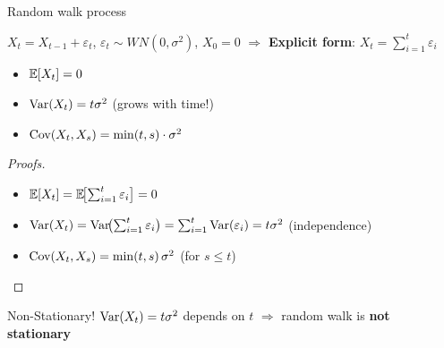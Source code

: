 \documentclass[9pt, aspectratio=169, t]{beamer}
\begin{document}
\begin{frame}{Random walk process}
    \small
    \vspace{-3mm}
    \begin{defn}
        $X_t = X_{t-1} + \varepsilon_t$, \; $\varepsilon_t \sim WN(0, \sigma^2)$, $X_0 = 0$ \;\;
        $\Rightarrow$ \textbf{Explicit form}: $X_t = \sum_{i=1}^{t} \varepsilon_i$
    \end{defn}
    \vspace{-2mm}
    {\footnotesize
    \begin{prop}[Properties]
        \begin{itemize}\setlength{\itemsep}{0pt}
            \item $\mathbb{E}[X_t] = 0$
            \item $\text{Var}(X_t) = t\sigma^2$ (grows with time!)
            \item $\text{Cov}(X_t, X_s) = \min(t, s) \cdot \sigma^2$
        \end{itemize}
    \end{prop}
    }
    \vspace{-2mm}
    {\scriptsize
    \begin{proof}[Proofs]
    \begin{itemize}\setlength{\itemsep}{0pt}
        \item $\mathbb{E}[X_t] = \mathbb{E}\!\bigl[\sum_{i=1}^{t} \varepsilon_i\bigr] = 0$
        \item $\text{Var}(X_t) = \text{Var}\!\bigl(\sum_{i=1}^{t} \varepsilon_i\bigr) = \sum_{i=1}^{t} \text{Var}(\varepsilon_i) = t\sigma^2$ \quad (independence)
        \item $\text{Cov}(X_t, X_s) = \min(t,s)\,\sigma^2$ \; (for $s \leq t$)
    \end{itemize}
    \end{proof}
    }
    \vspace{-2mm}
    \begin{alertblock}{Non-Stationary!}
    {\footnotesize $\text{Var}(X_t) = t\sigma^2$ depends on $t$ $\Rightarrow$ random walk is \textbf{not stationary}}
    \end{alertblock}
\end{frame}
\end{document}

